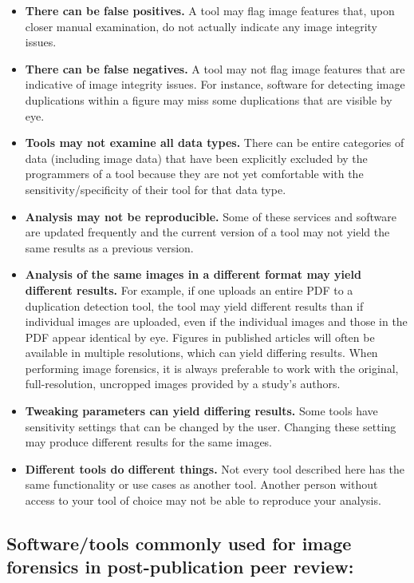 \documentclass[letterpaper, 12pt]{article}
\begin{document}
\begin{itemize}
    \setlength\itemsep{-0.5em}
    \item \textbf{There can be false positives.} A tool may flag image features that, upon closer manual examination, do not actually indicate any image integrity issues.
    \item \textbf{There can be false negatives.} A tool may not flag image features that are indicative of image integrity issues. For instance, software for detecting image duplications within a figure may miss some duplications that are visible by eye.
    \item \textbf{Tools may not examine all data types.} There can be entire categories of data (including image data) that have been explicitly excluded by the programmers of a tool because they are not yet comfortable with the sensitivity/specificity of their tool for that data type.
    \item \textbf{Analysis may not be reproducible.} Some of these services and software are updated frequently and the current version of a tool may not yield the same results as a previous version.
    \item \textbf{Analysis of the same images in a different format may yield different results.} For example, if one uploads an entire PDF to a duplication detection tool, the tool may yield different results than if individual images are uploaded, even if the individual images and those in the PDF appear identical by eye. Figures in published articles will often be available in multiple resolutions, which can yield differing results. When performing image forensics, it is always preferable to work with the original, full-resolution, uncropped images provided by a study's authors.
    \item \textbf{Tweaking parameters can yield differing results.} Some tools have sensitivity settings that can be changed by the user. Changing these setting may produce different results for the same images.
    \item \textbf{Different tools do different things.} Not every tool described here has the same functionality or use cases as another tool. Another person without access to your tool of choice may not be able to reproduce your analysis.
\end{itemize}

\pagebreak
\subsection*{Software/tools commonly used for image forensics in post-publication peer review:}
\end{document}

